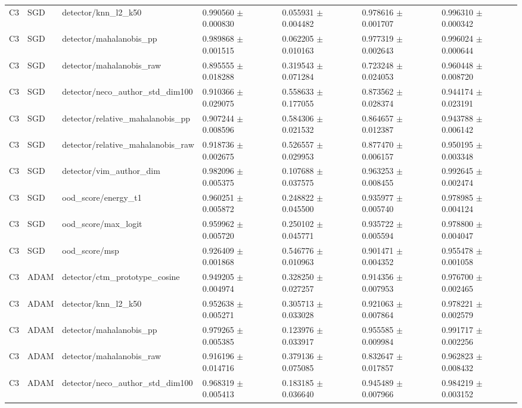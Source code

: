 \begin{longtable}{lllllll}
C3 & SGD & detector/knn\_l2\_k50 & 0.990560 $\pm$ 0.000830 & 0.055931 $\pm$ 0.004482 & 0.978616 $\pm$ 0.001707 & 0.996310 $\pm$ 0.000342 \\
C3 & SGD & detector/mahalanobis\_pp & 0.989868 $\pm$ 0.001515 & 0.062205 $\pm$ 0.010163 & 0.977319 $\pm$ 0.002643 & 0.996024 $\pm$ 0.000644 \\
C3 & SGD & detector/mahalanobis\_raw & 0.895555 $\pm$ 0.018288 & 0.319543 $\pm$ 0.071284 & 0.723248 $\pm$ 0.024053 & 0.960448 $\pm$ 0.008720 \\
C3 & SGD & detector/neco\_author\_std\_dim100 & 0.910366 $\pm$ 0.029075 & 0.558633 $\pm$ 0.177055 & 0.873562 $\pm$ 0.028374 & 0.944174 $\pm$ 0.023191 \\
C3 & SGD & detector/relative\_mahalanobis\_pp & 0.907244 $\pm$ 0.008596 & 0.584306 $\pm$ 0.021532 & 0.864657 $\pm$ 0.012387 & 0.943788 $\pm$ 0.006142 \\
C3 & SGD & detector/relative\_mahalanobis\_raw & 0.918736 $\pm$ 0.002675 & 0.526557 $\pm$ 0.029953 & 0.877470 $\pm$ 0.006157 & 0.950195 $\pm$ 0.003348 \\
C3 & SGD & detector/vim\_author\_dim & 0.982096 $\pm$ 0.005375 & 0.107688 $\pm$ 0.037575 & 0.963253 $\pm$ 0.008455 & 0.992645 $\pm$ 0.002474 \\
C3 & SGD & ood\_score/energy\_t1 & 0.960251 $\pm$ 0.005872 & 0.248822 $\pm$ 0.045500 & 0.935977 $\pm$ 0.005740 & 0.978985 $\pm$ 0.004124 \\
C3 & SGD & ood\_score/max\_logit & 0.959962 $\pm$ 0.005720 & 0.250102 $\pm$ 0.045771 & 0.935722 $\pm$ 0.005594 & 0.978800 $\pm$ 0.004047 \\
C3 & SGD & ood\_score/msp & 0.926409 $\pm$ 0.001868 & 0.546776 $\pm$ 0.010963 & 0.901471 $\pm$ 0.004352 & 0.955478 $\pm$ 0.001058 \\
C3 & ADAM & detector/ctm\_prototype\_cosine & 0.949205 $\pm$ 0.004974 & 0.328250 $\pm$ 0.027257 & 0.914356 $\pm$ 0.007953 & 0.976700 $\pm$ 0.002465 \\
C3 & ADAM & detector/knn\_l2\_k50 & 0.952638 $\pm$ 0.005271 & 0.305713 $\pm$ 0.033028 & 0.921063 $\pm$ 0.007864 & 0.978221 $\pm$ 0.002579 \\
C3 & ADAM & detector/mahalanobis\_pp & 0.979265 $\pm$ 0.005385 & 0.123976 $\pm$ 0.033917 & 0.955585 $\pm$ 0.009984 & 0.991717 $\pm$ 0.002256 \\
C3 & ADAM & detector/mahalanobis\_raw & 0.916196 $\pm$ 0.014716 & 0.379136 $\pm$ 0.075085 & 0.832647 $\pm$ 0.017857 & 0.962823 $\pm$ 0.008432 \\
C3 & ADAM & detector/neco\_author\_std\_dim100 & 0.968319 $\pm$ 0.005413 & 0.183185 $\pm$ 0.036640 & 0.945489 $\pm$ 0.007966 & 0.984219 $\pm$ 0.003152 \\

\end{longtable}

